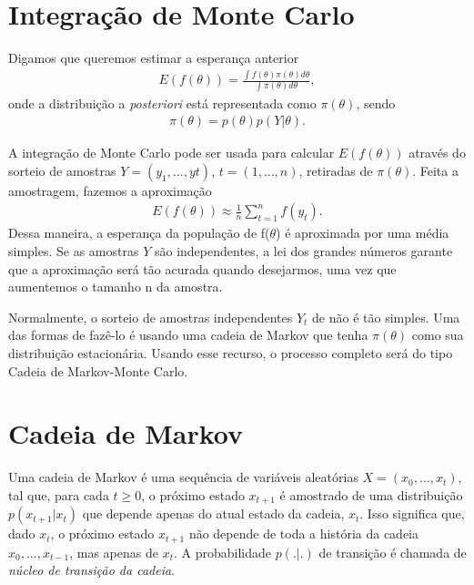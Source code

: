 \documentclass[
	12pt,				%
	openright,			%
	twoside,			%
	a4paper,			%
	english,			%
	brazil				%
	]{abntex2}
\begin{document}
\begin{anexosenv}
 \section{Integração de Monte Carlo}
 Digamos que queremos estimar a esperança anterior
 \begin{equation}
    \begin{aligned}
        E(f(\theta)) = \frac{\int f(\theta) \pi(\theta) d\theta}{\int \pi(\theta) d\theta},
     \end{aligned}
 \end{equation}
 onde a distribuição a \emph{posteriori} está representada como $\pi(\theta)$, sendo
 \begin{equation}
    \begin{aligned}
        \pi(\theta) = p(\theta) p(Y|\theta).
     \end{aligned}
 \end{equation}
 
 A integração de Monte Carlo pode ser usada para calcular $E(f(\theta))$ através do sorteio de amostras $Y = (y_{1}, ..., y{t})$, $t = (1, …, n)$, retiradas de $\pi(\theta)$. Feita a amostragem, fazemos a aproximação
 \begin{equation}
    \begin{aligned}
        E(f(\theta)) \approx \frac{1}{n} \sum_{t = 1}^{n} f(y_{t}).
     \end{aligned}
 \end{equation}
 Dessa maneira, a esperança da população de f($\theta$) é aproximada por uma média simples. Se as amostras $Y$ são independentes, a lei dos grandes números garante que a aproximação será tão acurada quando desejarmos, uma vez que aumentemos o tamanho n da amostra.
 
 Normalmente, o sorteio de amostras independentes $Y_{t}$ de  não é tão simples. Uma das formas de fazê-lo é usando uma cadeia de Markov que tenha $\pi(\theta)$ como sua distribuição estacionária. Usando esse recurso, o processo completo será do tipo Cadeia de Markov-Monte Carlo.
 
 \section{Cadeia de Markov}
 Uma cadeia de Markov é uma sequência de variáveis aleatórias $X = (x_{0}, ..., x_{t})$, tal que, para cada $t \geq 0$, o próximo estado $x_{t+1}$ é amostrado de uma distribuição $p(x_{t+1}|x_{t})$ que depende apenas do atual estado da cadeia, $x_{t}$. Isso significa que, dado $x_{t}$, o próximo estado $x_{t+1}$ não depende de toda a história da cadeia $x_{0}, ..., x_{t-1}$, mas apenas de $x_{t}$. A probabilidade $p(.|.)$ de transição é chamada de \emph{núcleo de transição da cadeia}.
 

\end{anexosenv}
\end{document}
